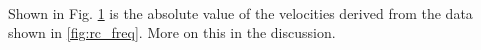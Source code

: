 \documentclass[11pt,a4paper]{article}
\begin{document}
    \begin{figure}[H]%
      \centering
       \\
      \caption{}%
      \label{fig:rc_exp}%
    \end{figure}

    Shown in Fig. \ref{fig:rc_exp} is the absolute value of the velocities derived from the data shown in \ref{fig:rc_freq}. More on this in the discussion.
\end{document}
